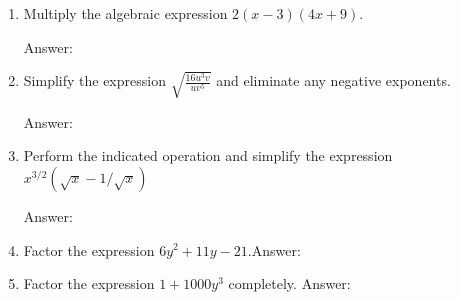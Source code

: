 \documentclass[11pt]{article}
\begin{document}
\begin{enumerate}
\vfill
\newpage


\item Multiply the algebraic expression  $ 2(x-3)(4x+9).$\\
 \begin{flushright}{Answer: \underline{\hspace{2in}}}\end{flushright}
 
\vfill

\item Simplify the expression $\sqrt{\frac{16u^3v}{uv^5}}$ and eliminate any negative exponents.\\
\begin{flushright}{Answer: \underline{\hspace{2in}}}\end{flushright}

\vfill


\item Perform the indicated operation and simplify the expression $x^{3/2}(\sqrt{x}-1/\sqrt{x})$\\
\begin{flushright}{Answer: \underline{\hspace{2in}}}\end{flushright}

\vfill

\item Factor the expression $6y^2+11y-21.$\hfill Answer: \underline{\hspace{2in}}\\
\vfill


\item Factor the expression $1+1000y^3$ completely. \hfill Answer: \underline{\hspace{2in}}\\
\vfill




\end{enumerate}
\end{document}
